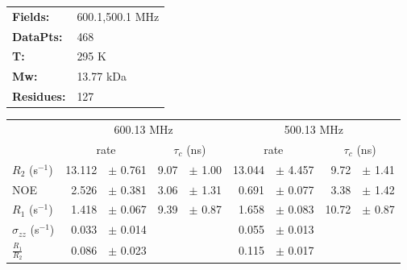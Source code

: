 \documentclass[showkeys,aps,prb,prepreint,amssymb, amsmath,nobibnotes]{article}
\begin{document}
\begin{tabular}{ll}
\textbf{Fields:} &  600.1,500.1 MHz\\
\textbf{DataPts:} &  468\\
 \textbf{T:} & 295 K\\
\textbf{Mw:} & 13.77 kDa\\
\textbf{Residues: } &   127\\
\end{tabular}

\begin{small}
\noindent \begin{tabular}{l|rlrl|rlrl}
& \multicolumn{4}{c}{600.13 MHz}& \multicolumn{4}{c}{500.13 MHz}\\
&  \multicolumn{2}{c}{rate} & \multicolumn{2}{c}{$\tau_c$ (ns)}   &  \multicolumn{2}{c}{rate} & \multicolumn{2}{c}{$\tau_c$ (ns)}   \\
\hline$R_2$  (s$^{-1}$)  &  13.112 & $\pm$ 0.761   &  9.07 & $\pm$ 1.00 &  13.044 & $\pm$ 4.457   &  9.72 & $\pm$ 1.41 \\
NOE  &  2.526 & $\pm$ 0.381   &  3.06 & $\pm$ 1.31 &  0.691 & $\pm$ 0.077   &  3.38 & $\pm$ 1.42 \\
$R_1$ (s$^{-1}$)  &  1.418 & $\pm$ 0.067   &  9.39 & $\pm$ 0.87 &  1.658 & $\pm$ 0.083   &  10.72 & $\pm$ 0.87 \\
$\sigma_{zz}$  (s$^{-1}$)  &  0.033 & $\pm$ 0.014   & & &  0.055 & $\pm$ 0.013   & & \\
$\frac{R_1}{R_2}$  &  0.086 & $\pm$ 0.023   & & &  0.115 & $\pm$ 0.017   & & \\
\end{tabular}
\end{small}
\end{document}
